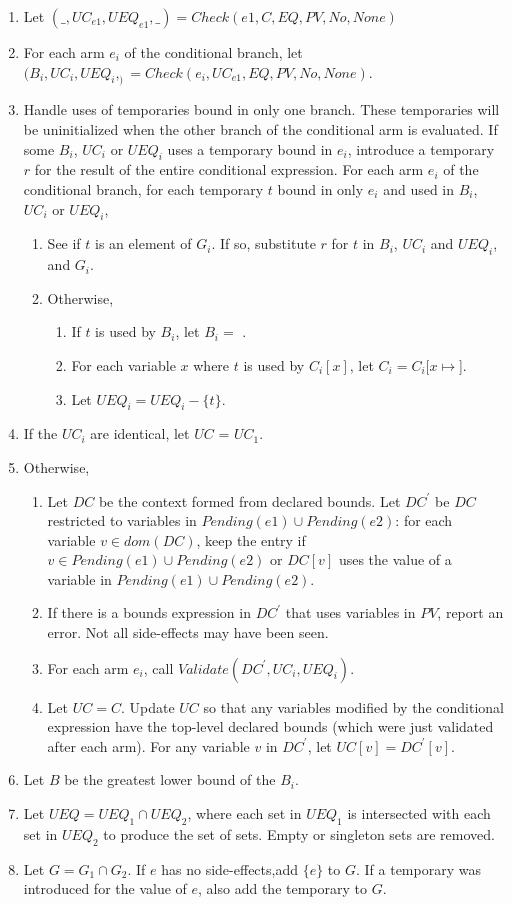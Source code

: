 \begin{enumerate}
\item Let $(\_, {UC}_{e1}, {UEQ}_{e1}, \_)= Check(e1, C, EQ, PV, No, None)$
\item For each arm $e_i$ of the conditional branch,
        let $(B_i, {UC}_i, {UEQ}_i, _) = Check(e_i, {UC}_{e1}, EQ, PV, No, None)$.
\item Handle uses of temporaries bound in only one branch.  These temporaries
will be uninitialized when the other branch of the conditional arm is evaluated.
If some $B_i$, ${UC}_i$ or ${UEQ}_i$ uses a temporary bound in $e_i$,
introduce a  temporary $r$ for the result of the entire conditional expression.
For each arm $e_i$ of the conditional branch, for each temporary $t$ bound
in only $e_i$ and used in $B_i$, ${UC}_i$ or ${UEQ}_i$,
\begin{enumerate}
\item See if $t$ is an element of $G_i$. If so, substitute $r$ for $t$ in $B_i$, ${UC}_i$ and ${UEQ}_i$,
and $G_i$.
\item Otherwise,
\begin{enumerate}
\item If $t$ is used by $B_i$, let $B_i = $ \boundsunknown.
\item For each variable $x$ where $t$ is used by $C_i[x]$, let $C_i = C_i[x \mapsto $\boundsunknown].
\item Let ${UEQ}_i = {UEQ}_i - \{ t \}$.
\end{enumerate}
\end{enumerate}
\item If the ${UC}_i$ are identical, let $UC$ = $UC_1$.
\item Otherwise,
\begin{enumerate}
\item Let $DC$ be the context formed from declared bounds.
Let $DC^\prime$ be $DC$ restricted to variables in $Pending(e1) \cup Pending(e2)$:
for each variable $v \in dom(DC)$, keep the entry if $v \in Pending(e1) \cup Pending(e2)$
or $DC[v]$ uses the value of a variable in $Pending(e1) \cup Pending(e2)$.
\item If there is a bounds expression in $DC^\prime$ that uses variables in $PV$,
report an error.   Not all side-effects may have been seen.
\item For each arm $e_i$, call $Validate(DC^\prime, {UC}_i, {UEQ}_i)$.
\item Let $UC = C$.  Update $UC$ so that any variables modified by the conditional expression
have the top-level declared bounds (which were just validated after each arm).
For any variable $v$ in $DC^\prime$, let $UC[v] = DC^\prime[v]$.
\end{enumerate}
\item Let $B$ be the greatest lower bound of the $B_i$.
\item Let $UEQ = {UEQ}_1 \cap {UEQ}_2$,  where each set in $UEQ_1$ is intersected with each set in $UEQ_2$
to produce the set of sets.  Empty or singleton sets are removed.
\item Let $G = G_1 \cap G_2$.  If $e$ has no side-effects,add $\{ e \}$ to $G$.  If a
temporary was introduced for the value of $e$,  also add the temporary to $G$.
\end{enumerate}

